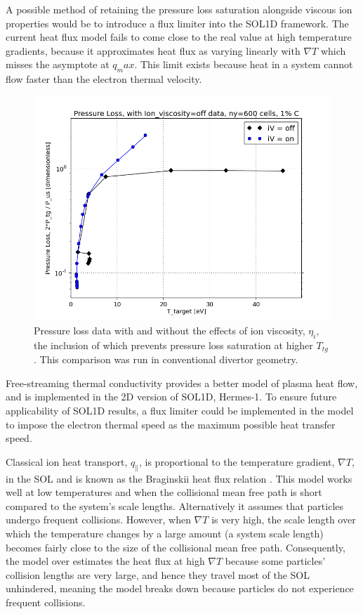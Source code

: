 \documentclass[12pt]{article}  %
\providecommand{\Ttg}{$T_{tg}~$} %
\newcommand{\citep}[1]{\cite{#1}}
\begin{document}
A possible method of retaining the pressure loss saturation alongside viscous ion properties would be to introduce a flux limiter into the SOL1D framework. The current heat flux model \cite{Braginskii1965} fails to come close to the real value at high temperature gradients, because it approximates heat flux as varying linearly with $\nabla T$ which misses the asymptote at $q_max$. This limit exists because heat in a system cannot flow faster than the electron thermal velocity.

\begin{figure}
	\includegraphics[scale=0.5]{Figures/sol1d/PL_iVpts.png}
	\centering
	\caption{Pressure loss data with and without the effects of ion viscosity, $\eta_i$, the inclusion of which prevents pressure loss saturation at higher \Ttg. This comparison was run in conventional divertor geometry.}\label{figPL_iVpts}
\end{figure}

Free-streaming thermal conductivity provides a better model of plasma heat flow, and is implemented in the 2D version of SOL1D, Hermes-1. To ensure future applicability of SOL1D results, a flux limiter could be implemented in the model to impose the electron thermal speed as the maximum possible heat transfer speed.

Classical ion heat transport, $q_{\parallel}$, is proportional to the temperature gradient, $\nabla T$, in the SOL and is known as the Braginskii heat flux relation \citep{Braginskii1965}. This model works well at low temperatures and when the collisional mean free path is short compared to the system's scale lengths. Alternatively it assumes that particles undergo frequent collisions. However, when $\nabla T$ is very high, the scale length over which the temperature changes by a large amount (a system scale length) becomes fairly close to the size of the collisional mean free path. Consequently, the model over estimates the heat flux at high $\nabla T$ because some particles' collision lengths are very large, and hence they travel most of the SOL unhindered, meaning the model breaks down because particles do not experience frequent collisions.
\end{document}
